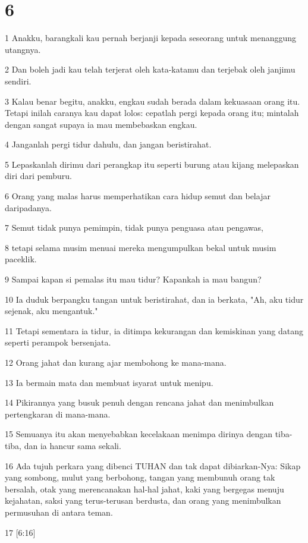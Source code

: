 \chapter{6}

\par 1 Anakku, barangkali kau pernah berjanji kepada seseorang untuk menanggung utangnya.
\par 2 Dan boleh jadi kau telah terjerat oleh kata-katamu dan terjebak oleh janjimu sendiri.
\par 3 Kalau benar begitu, anakku, engkau sudah berada dalam kekuasaan orang itu. Tetapi inilah caranya kau dapat lolos: cepatlah pergi kepada orang itu; mintalah dengan sangat supaya ia mau membebaskan engkau.
\par 4 Janganlah pergi tidur dahulu, dan jangan beristirahat.
\par 5 Lepaskanlah dirimu dari perangkap itu seperti burung atau kijang melepaskan diri dari pemburu.
\par 6 Orang yang malas harus memperhatikan cara hidup semut dan belajar daripadanya.
\par 7 Semut tidak punya pemimpin, tidak punya penguasa atau pengawas,
\par 8 tetapi selama musim menuai mereka mengumpulkan bekal untuk musim paceklik.
\par 9 Sampai kapan si pemalas itu mau tidur? Kapankah ia mau bangun?
\par 10 Ia duduk berpangku tangan untuk beristirahat, dan ia berkata, "Ah, aku tidur sejenak, aku mengantuk."
\par 11 Tetapi sementara ia tidur, ia ditimpa kekurangan dan kemiskinan yang datang seperti perampok bersenjata.
\par 12 Orang jahat dan kurang ajar membohong ke mana-mana.
\par 13 Ia bermain mata dan membuat isyarat untuk menipu.
\par 14 Pikirannya yang busuk penuh dengan rencana jahat dan menimbulkan pertengkaran di mana-mana.
\par 15 Semuanya itu akan menyebabkan kecelakaan menimpa dirinya dengan tiba-tiba, dan ia hancur sama sekali.
\par 16 Ada tujuh perkara yang dibenci TUHAN dan tak dapat dibiarkan-Nya: Sikap yang sombong, mulut yang berbohong, tangan yang membunuh orang tak bersalah, otak yang merencanakan hal-hal jahat, kaki yang bergegas menuju kejahatan, saksi yang terus-terusan berdusta, dan orang yang menimbulkan permusuhan di antara teman.
\par 17 [6:16]

